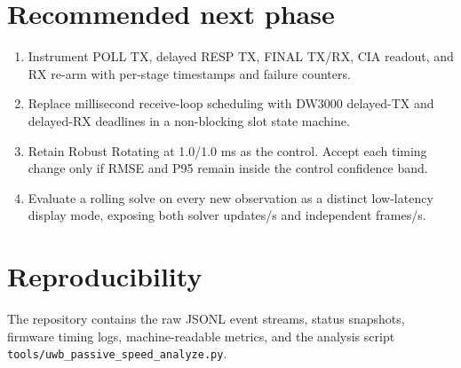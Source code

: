 \documentclass[11pt,a4paper]{article}
\begin{document}
\section{Recommended next phase}

\begin{enumerate}
\item Instrument POLL TX, delayed RESP TX, FINAL TX/RX, CIA readout, and RX
re-arm with per-stage timestamps and failure counters.
\item Replace millisecond receive-loop scheduling with DW3000 delayed-TX and
delayed-RX deadlines in a non-blocking slot state machine.
\item Retain Robust Rotating at 1.0/1.0 ms as the control. Accept each timing
change only if RMSE and P95 remain inside the control confidence band.
\item Evaluate a rolling solve on every new observation as a distinct
low-latency display mode, exposing both solver updates/s and independent
frames/s.
\end{enumerate}

\section{Reproducibility}

The repository contains the raw JSONL event streams, status snapshots,
firmware timing logs, machine-readable metrics, and the analysis script
\texttt{tools/uwb\_passive\_speed\_analyze.py}.
\end{document}
